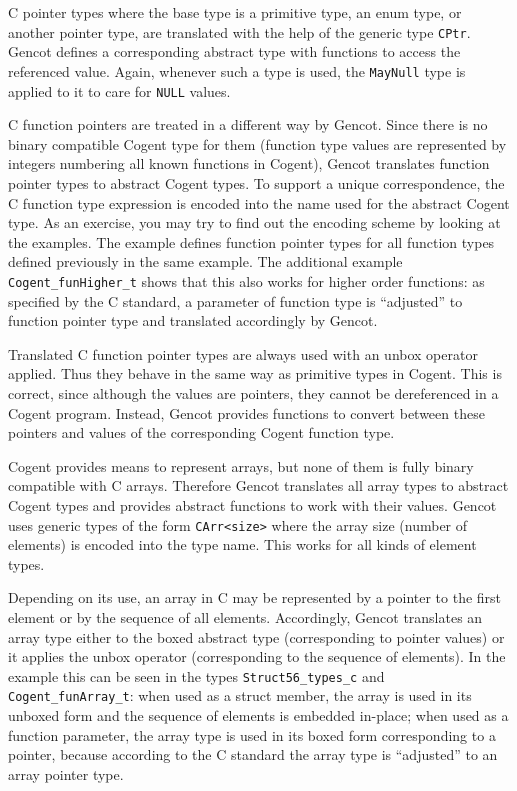 \documentclass[a4paper]{report}
\newcommand{\code}[1]{\textnormal{\texttt{#1}}}
\begin{document}
C pointer types where the base type is a primitive type, an enum type, or another pointer type, are translated with the
help of the generic type \code{CPtr}. Gencot defines a corresponding abstract type with functions to access the 
referenced value. Again, whenever such a type is used, the \code{MayNull} type is applied to it to care for \code{NULL} 
values.

C function pointers are treated in a different way by Gencot. Since there is no binary compatible Cogent type for them 
(function type values are represented by integers numbering all known functions in Cogent), Gencot translates function pointer
types to abstract Cogent types. To support a unique correspondence, the C function type expression is encoded into
the name used for the abstract Cogent type. As an exercise, you may try to find out the encoding scheme by looking
at the examples. The example defines function pointer types for all function types defined previously in the same example. 
The additional example \code{Cogent\_funHigher\_t} shows that this also works for higher order functions: as specified by the 
C standard, a parameter of function type is ``adjusted'' to function pointer type and translated accordingly by Gencot.

Translated C function pointer types are always used with an unbox operator applied. Thus they behave in the same way as 
primitive types in Cogent. This is correct, since although the values are pointers, they cannot be dereferenced in 
a Cogent program. Instead, Gencot provides functions to convert between these pointers and values of the corresponding
Cogent function type.

Cogent provides means to represent arrays, but none of them is fully binary compatible with C arrays. Therefore Gencot
translates all array types to abstract Cogent types and provides abstract functions to work with their values. Gencot
uses generic types of the form \code{CArr<size>} where the array size (number of elements) is encoded into the type name.
This works for all kinds of element types.

Depending on its use, an array in C may be represented by a pointer to the first element or by the sequence of all elements.
Accordingly, Gencot translates an array type either to the boxed abstract type (corresponding to pointer values) or it
applies the unbox operator (corresponding to the sequence of elements). In the example this can be seen in the types 
\code{Struct56\_types\_c} and \code{Cogent\_funArray\_t}: when used as a struct member, the array is used in its unboxed
form and the sequence of elements is embedded in-place; when used as a function parameter, the array type is used in 
its boxed form corresponding to a pointer, because according to the C standard the array type is ``adjusted'' to an array
pointer type.
\end{document}
